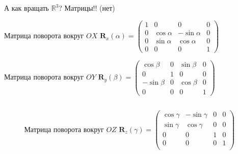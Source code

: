 \documentclass[10pt]{beamer}
\begin{document}
	
	\begin{frame}{А как вращать $\mathbb R^3$? Матрицы!! (нет)}
		\footnotesize
		{
			\begin{block}{Матрица поворота вокруг $OX$}
				\centering 
				$ \mathbf R_x(\alpha)
				=
				\begin{pmatrix}
					1&0&0&0\\
					0&\cos\alpha&-\sin\alpha&0\\
					0&\sin\alpha&\cos\alpha&0\\
					0&0&0&1				 	
				\end{pmatrix}
				$				
			\end{block}
		}
		{
			\begin{block}{Матрица поворота вокруг $OY$}
				\centering 
				$ \mathbf R_y(\beta)
				=
				\begin{pmatrix}
					\cos\beta&0&\sin\beta&0\\
					0&1&0&0\\
					-\sin\beta&0&\cos\beta &0\\
					0&0&0&1				 	
				\end{pmatrix}
				$				
			\end{block}
		}
		
		\begin{columns}
			\begin{column}{0.25\textwidth}
				~
			\end{column}
			\begin{column}{0.5\textwidth}
				\begin{block}{Матрица поворота вокруг $OZ$}
					\centering 
					$ \mathbf R_z(\gamma)
					=
					\begin{pmatrix}
						\cos\gamma&-\sin\gamma&0&0\\
						\sin\gamma&\cos\gamma&0&0\\
						0&0&1&0 \\
						0&0&0&1	\\			 	
					\end{pmatrix}
					$				
				\end{block}
			\end{column}
			\begin{column}{0.25\textwidth}
				~
			\end{column}
		\end{columns}
		

\end{frame}
\end{document}
